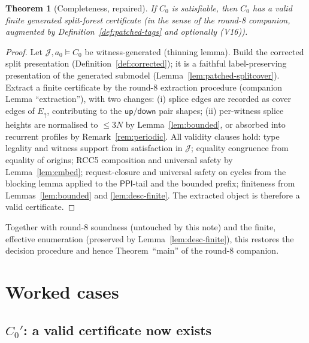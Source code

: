 \documentclass[11pt]{article}
\newtheorem{theorem}{Theorem}[section]
\newcommand{\PPI}{\mathsf{PPI}}
\newcommand{\Eup}{E_{\uparrow}}
\newcommand{\up}{\mathsf{up}}
\newcommand{\down}{\mathsf{down}}
\newcommand{\J}{\mathcal J}
\begin{document}
\begin{theorem}[Completeness, repaired]\label{thm:complete}
If $C_0$ is satisfiable, then $C_0$ has a valid finite generated split-forest
certificate (in the sense of the round-8 companion, augmented by
Definition~\ref{def:patched-tags} and optionally (V16)).
\end{theorem}

\begin{proof}
Let $\J,a_0\models C_0$ be witness-generated (thinning lemma).  Build the
corrected split presentation (Definition~\ref{def:corrected}); it is a faithful
label-preserving presentation of the generated submodel
(Lemma~\ref{lem:patched-splitcover}).  Extract a finite certificate by the
round-8 extraction procedure (companion Lemma ``extraction''), with two changes:
(i) splice edges are recorded as cover edges of $\Eup$, contributing to the
$\up/\down$ pair shapes; (ii) per-witness splice heights are normalised to
$\le 3N$ by Lemma~\ref{lem:bounded}, or absorbed into recurrent profiles by
Remark~\ref{rem:periodic}.  All validity clauses hold: type legality and witness
support from satisfaction in $\J$; equality congruence from equality of origins;
RCC5 composition and universal safety by Lemma~\ref{lem:embed}; request-closure
and universal safety on cycles from the blocking lemma applied to the $\PPI$-tail
and the bounded prefix; finiteness from Lemmas~\ref{lem:bounded} and
\ref{lem:desc-finite}.  The extracted object is therefore a valid certificate.
\end{proof}

Together with round-8 soundness (untouched by this note) and the finite,
effective enumeration (preserved by Lemma~\ref{lem:desc-finite}), this restores
the decision procedure and hence Theorem~``main'' of the round-8 companion.

\section{Worked cases}

\subsection{\texorpdfstring{$C_0'$}{C0'}: a valid certificate now exists}
\end{document}

